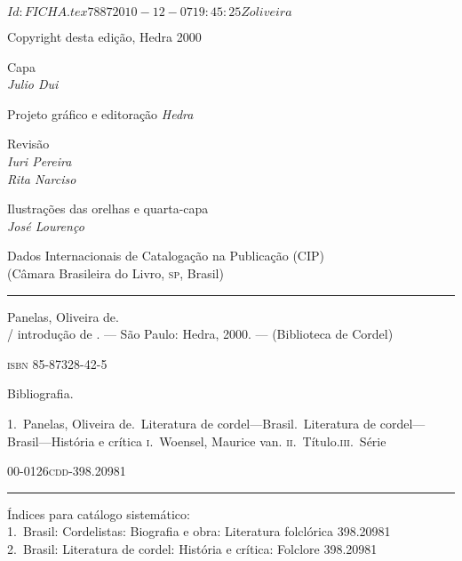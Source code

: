 \SVN $Id: FICHA.tex 7887 2010-12-07 19:45:25Z oliveira $

\pagebreak

\begingroup \fontsize{9pt}{0.7\baselineskip}\selectfont \parskip=0pt\thispagestyle{empty} 

\begin{center}
Copyright\raisebox{-1.2mm}{$^\copyright$}  desta edição, Hedra 2000\\\medskip

Capa\\
\textit{Julio Dui}\\\medskip

Projeto gráfico e editoração
\textit{Hedra}

Revisão\\
\textit{Iuri Pereira}\\
\textit{Rita Narciso}\\\medskip

Ilustrações das orelhas e quarta-capa\\
\textit{José Lourenço}\\\bigskip

\begin{minipage}{.8\textwidth}
\fontsize{7pt}{5pt}\selectfont
Dados Internacionais de Catalogação na Publicação (CIP)\\
(Câmara Brasileira do Livro, \textsc{sp}, Brasil)\\
\mbox{}\vspace{-0.2ex}\hrule\vspace{1ex}

Panelas, Oliveira de.\\
\makeatletter\@autor / introdução de \@introdutor\makeatother.
--- São Paulo: Hedra, 2000. --- (Biblioteca de Cordel)\\\smallskip

\textsc{isbn} 85-87328-42-5\\\smallskip

Bibliografia.

1.~Panelas, Oliveira de.~Literatura de
cordel---Brasil.~Literatura de
cordel---Brasil---História e crítica\quad 
\textsc{i}.~Woensel, Maurice van.\quad
\textsc{ii}.~Título.\quad \textsc{iii}.~Série\\\medskip

00-0126\hfill \textsc{cdd}-398.20981

\vspace{1ex}\hrule\vspace{1ex}
Índices para catálogo sistemático:\\
1.~Brasil: Cordelistas: Biografia e obra: Literatura folclórica 398.20981\\
2.~Brasil: Literatura de cordel: História e crítica: Folclore 398.20981
\end{minipage}
\vfill


\end{center}
